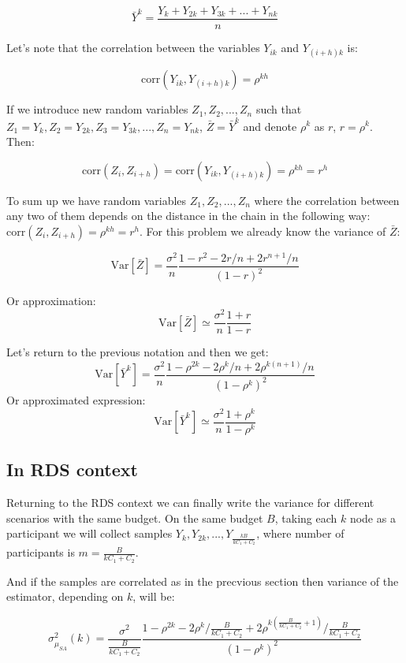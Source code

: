 \documentclass[12pt]{report}
\begin{document}
$$\bar{Y}^k = \frac{Y_k + Y_{2k} + Y_{3k} + ... + Y_{nk}}{n}$$

Let's note that the correlation between the variables $Y_{ik}$ and $Y_{(i+h)k}$ is: 

 $$\mathrm{corr}(Y_{ik}, Y_{(i+h)k}) = \rho^{kh}$$

If we introduce new random variables $Z_1, Z_2, ..., Z_n$ such that $Z_1 = Y_k, Z_2 = Y_{2k}, Z_3 = Y_{3k},..., Z_n = Y_{nk}$, $\bar{Z}= \bar{Y}^k$ and denote $\rho^k$ as $r$, $r = \rho^k$. Then:

$$\mathrm{corr}(Z_i, Z_{i+h}) = \mathrm{corr}(Y_{ik}, Y_{(i+h)k}) = \rho^{kh} = r^h$$

To sum up we have random variables $Z_1, Z_2, ..., Z_n$ where the correlation between any two of them depends on the distance in the chain in the following way: $\mathrm{corr}(Z_i, Z_{i+h}) = \rho^{kh} = r^h$. For this problem we already know the variance of $\bar{Z}$:


$$ \mathrm{Var}\left[\bar{Z} \right] = \frac{\sigma^2}{n}\frac{1-r^2 - 2r/n + 2r^{n+1}/n}{(1-r)^2}$$

Or approximation:
$$\mathrm{Var}\left[\bar{Z} \right] \simeq  \frac{\sigma^2}{n} \frac{1+r}{1-r}$$



Let's return to the previous notation and then we get:
$$\mathrm{Var}\left[\bar{Y}^k \right] = \frac{\sigma^2}{n}\frac{1-\rho^{2k} - 2\rho^k/n + 2\rho^{k(n+1)}/n}{(1-\rho^k)^2}$$
Or approximated expression:
$$\mathrm{Var}\left[\bar{Y}^k \right] \simeq  \frac{\sigma^2}{n} \frac{1+\rho^k}{1-\rho^k}$$


\subsection{In RDS context}

Returning to the RDS context we can finally write the variance for different scenarios with the same budget. On the same budget $B$, taking each $k$ node as a participant we will collect samples $Y_k, Y_{2k}, ..., Y_{\frac{kB}{kC_1 + C_2}}$, where number of participants is $m = \frac{B}{kC_1 + C_2}$. 
 
And if the samples are correlated as in the precvious section then variance of the estimator, depending on $k$, will be:

$$ \sigma^2_{\hat{\mu}_{SA}} (k) = \frac{\sigma^2}{\frac{B}{kC_1 + C_2}}\frac{1-\rho^{2k} - 2\rho^k/\frac{B}{kC_1 + C_2} + 2\rho^{k(\frac{B}{kC_1 + C_2}+1)}/\frac{B}{kC_1 + C_2}}{(1-\rho^k)^2}$$
\end{document}
